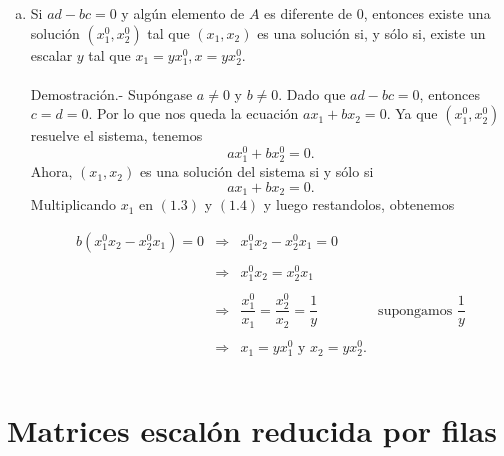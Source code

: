 \begin{enumerate}[\bfseries 1.]
\begin{enumerate}[(a)]
	    \item Si $ad-bc= 0$ y algún elemento de $A$ es diferente de $0$, entonces existe una solución $\left(x_1^0,x_2^0 \right)$ tal que $(x_1,x_2)$ es una solución si, y sólo si, existe un escalar $y$ tal que $x_1=yx_1^0, x=yx_2^0.$\\\\
		Demostración.-\; Supóngase $a\neq 0$ y $b\neq 0$. Dado que $ad-bc=0$, entonces $c=d=0$. Por lo que nos queda la ecuación $ax_1+bx_2=0$. Ya que $(x_1^0,x_2^0)$ resuelve el sistema, tenemos
		\begin{equation}
		    ax_1^{0}+bx_2^{0}=0.
		\end{equation}
		Ahora, $(x_1,x_2)$ es una solución del sistema si y sólo si 
		\begin{equation}
		    ax_1+bx_2=0.
		\end{equation}
		Multiplicando $x_1$ en $(1.3)$ y $(1.4)$ y luego restandolos, obtenemos

		$$\begin{array}{rcll}
		    b\left(x_1^0x_2-x_2^0x_1\right)=0&\Rightarrow&x_1^0x_2-x_2^0x_1=0&\\\\
						     &\Rightarrow&x_1^0x_2=x_2^0x_1&\\\\
						     &\Rightarrow&\dfrac{x_1^0}{x_1}=\dfrac{x_2^0}{x_2}=\dfrac{1}{y}&\mbox{supongamos }\dfrac{1}{y}\\\\
						     &\Rightarrow&x_1=yx_1^0 \mbox{ y } x_2=yx_2^0.\\\\
		\end{array}$$
		\vspace{0.5cm}

	\end{enumerate}

\end{enumerate}


\section{Matrices escalón reducida por filas}

